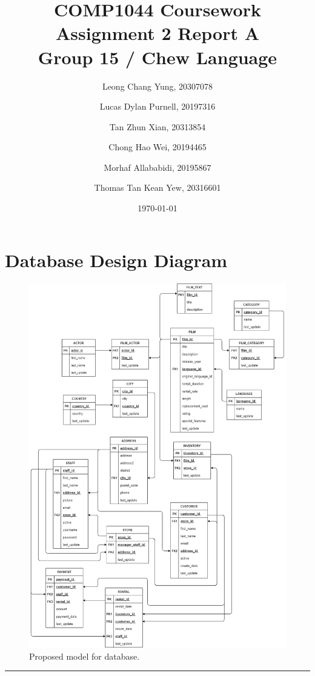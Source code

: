 \documentclass{article}
\title{COMP1044 Coursework Assignment 2 Report A \\ Group 15 / Chew Language}
\author{
	Leong Chang Yung, 20307078
	\and
	Lucas Dylan Purnell, 20197316
	\and
	Tan Zhun Xian, 20313854
	\and
	Chong Hao Wei, 20194465
	\and
	Morhaf Allababidi, 20195867
	\and
	Thomas Tan Kean Yew, 20316601
}
\date{\today}
\begin{document}
\maketitle
\newpage

\section{Database Design Diagram}
	\begin{figure}[H]
		\includegraphics[width=\textwidth]{DBI CourseworkA}
		\caption{Proposed model for database.}	
	\end{figure}
	\rule{\textwidth}{0.4pt}
		
\end{document}
